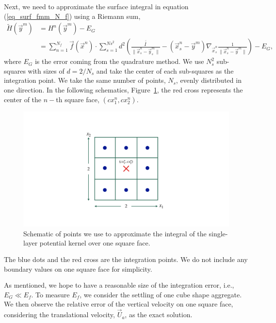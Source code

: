 \par
Next, we need to approximate the surface integral in equation (\ref{eq_surf_fmm_N_f}) using a Riemann sum,
\begin{align}
	\tilde{H}(\vec{y}^m) 
	& = H^n(\vec{y}^m) - E_{G} 
	\nonumber \\ 
	& =
	\sum_{n = 1}^{N_f} 
	\vec{f}(\vec{x}^n) \cdot
	\sum_{s=1}^{Ns^2} d^2 
  	\left(
  	\frac{\bar{\bar{I \ }}}{\|\vec{x}_s^n - \vec{y}_s^m\|}
  	- \left( \vec{x}_s^n - \vec{y}^m \right)
  	 \nabla_{\vec{x}_s^n}
  	\frac{1}{\|\vec{x}_s^n - \vec{y}^m\|}
  	\right)
	  - E_{G},
 \label{eq_surf_fmm_N_f_n}
\end{align}
where $E_G$ is the error coming from the quadrature method. 
We use $N_s^2$ sub-squares with sizes of $d = 2/N_s$ and take the center of each sub-squares as the integration point. 
We take the same number of points, $N_s$, evenly distributed in one direction. 
In the following schematics, Figure~\ref{fig_face_grid}, the red cross represents the center of the $n-$th square face, $(cx^n_1, cx^n_2)$.
\begin{figure}[h]
	\begin{center}
		\includegraphics[scale=0.17]{./figures/fig_face_grid}
	\caption{Schematic of points we use to approximate the integral of the single-layer potential kernel over one square face.}
	\label{fig_face_grid}
\end{center}
\end{figure}
The blue dots and the red cross are the integration points.
We do not include any boundary values on one square face for simplicity.
\par
As mentioned, we hope to have a reasonable size of the integration error, i.e., $E_G \ll E_f$.
To measure $E_f$, we consider the settling of one cube shape aggregate.
We then observe the relative error of the vertical velocity on one square face, considering the translational velocity, $\vec{U}_a$, as the exact solution.
